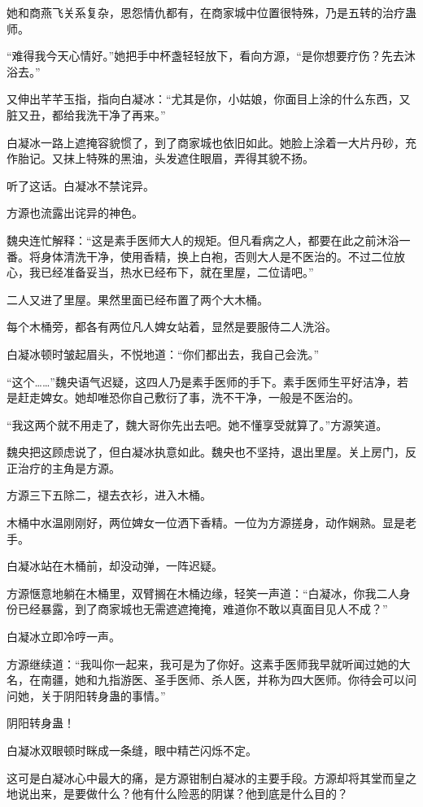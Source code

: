 \begin{this_body}
她和商燕飞关系复杂，恩怨情仇都有，在商家城中位置很特殊，乃是五转的治疗蛊师。

“难得我今天心情好。”她把手中杯盏轻轻放下，看向方源，“是你想要疗伤？先去沐浴去。”

又伸出芊芊玉指，指向白凝冰：“尤其是你，小姑娘，你面目上涂的什么东西，又脏又丑，都给我洗干净了再来。”

白凝冰一路上遮掩容貌惯了，到了商家城也依旧如此。她脸上涂着一大片丹砂，充作胎记。又抹上特殊的黑油，头发遮住眼眉，弄得其貌不扬。

听了这话。白凝冰不禁诧异。

方源也流露出诧异的神色。

魏央连忙解释：“这是素手医师大人的规矩。但凡看病之人，都要在此之前沐浴一番。将身体清洗干净，使用香精，换上白袍，否则大人是不医治的。不过二位放心，我已经准备妥当，热水已经布下，就在里屋，二位请吧。”

二人又进了里屋。果然里面已经布置了两个大木桶。

每个木桶旁，都各有两位凡人婢女站着，显然是要服侍二人洗浴。

白凝冰顿时皱起眉头，不悦地道：“你们都出去，我自己会洗。”

“这个……”魏央语气迟疑，这四人乃是素手医师的手下。素手医师生平好洁净，若是赶走婢女。她却唯恐你自己敷衍了事，洗不干净，一般是不医治的。

“我这两个就不用走了，魏大哥你先出去吧。她不懂享受就算了。”方源笑道。

魏央把这顾虑说了，但白凝冰执意如此。魏央也不坚持，退出里屋。关上房门，反正治疗的主角是方源。

方源三下五除二，褪去衣衫，进入木桶。

木桶中水温刚刚好，两位婢女一位洒下香精。一位为方源搓身，动作娴熟。显是老手。

白凝冰站在木桶前，却没动弹，一阵迟疑。

方源惬意地躺在木桶里，双臂搁在木桶边缘，轻笑一声道：“白凝冰，你我二人身份已经暴露，到了商家城也无需遮遮掩掩，难道你不敢以真面目见人不成？”

白凝冰立即冷哼一声。

方源继续道：“我叫你一起来，我可是为了你好。这素手医师我早就听闻过她的大名，在南疆，她和九指游医、圣手医师、杀人医，并称为四大医师。你待会可以问问她，关于阴阳转身蛊的事情。”

阴阳转身蛊！

白凝冰双眼顿时眯成一条缝，眼中精芒闪烁不定。

这可是白凝冰心中最大的痛，是方源钳制白凝冰的主要手段。方源却将其堂而皇之地说出来，是要做什么？他有什么险恶的阴谋？他到底是什么目的？


\end{this_body}
